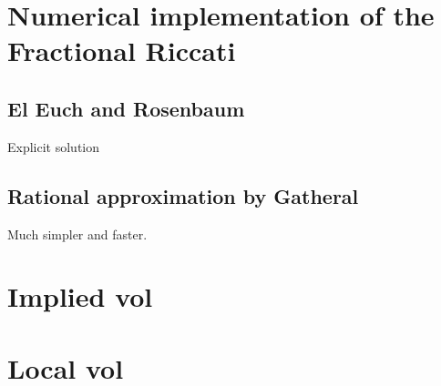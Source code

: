 \documentclass[12pt]{article}
\theoremstyle{plain}
\begin{document}
\section{Numerical implementation of the Fractional Riccati}

\subsection{El Euch and Rosenbaum}

Explicit solution

\subsection{Rational approximation by Gatheral}

Much simpler and faster.

\section{Implied vol}

\section{Local vol}
\end{document}
